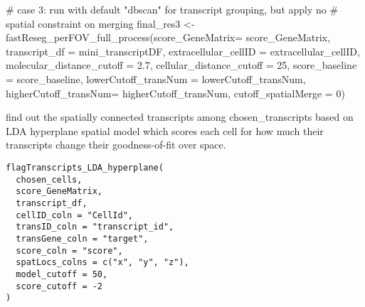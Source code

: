 \documentclass[letterpaper]{book}
\begin{document}
\begin{Examples}
\begin{ExampleCode}
# case 3: run with default "dbscan" for transcript grouping, but apply no 
# spatial constraint on merging
final_res3 <- fastReseg_perFOV_full_process(score_GeneMatrix= score_GeneMatrix,
                                            transcript_df = mini_transcriptDF,
                                            extracellular_cellID = extracellular_cellID,
                                            molecular_distance_cutoff = 2.7,
                                            cellular_distance_cutoff = 25,
                                            score_baseline = score_baseline,
                                            lowerCutoff_transNum = lowerCutoff_transNum,
                                            higherCutoff_transNum= higherCutoff_transNum,
                                            cutoff_spatialMerge = 0)
\end{ExampleCode}
\end{Examples}
%
\begin{Description}
find out the spatially connected transcripts among chosen\_transcripts based on LDA hyperplane spatial model which scores each cell for how much their transcripts change their goodness-of-fit over space.
\end{Description}
%
\begin{Usage}
\begin{verbatim}
flagTranscripts_LDA_hyperplane(
  chosen_cells,
  score_GeneMatrix,
  transcript_df,
  cellID_coln = "CellId",
  transID_coln = "transcript_id",
  transGene_coln = "target",
  score_coln = "score",
  spatLocs_colns = c("x", "y", "z"),
  model_cutoff = 50,
  score_cutoff = -2
)
\end{verbatim}
\end{Usage}
%
\end{document}
